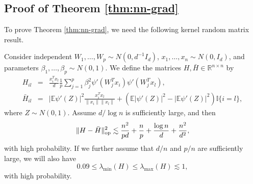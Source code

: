 \subsection{Proof of Theorem \ref{thm:nn-grad}}

To prove Theorem \ref{thm:nn-grad}, we need the following kernel random matrix result.
\begin{lemma}\label{lem:lim-H}
Consider independent $W_1,\ldots,W_p\sim N(0,d^{-1}I_d)$, $x_1,\ldots,x_n\sim N(0,I_d)$, and parameters $\beta_1,\ldots,\beta_p\sim N(0,1)$. We define the matrices $H, \bar{H}\in\mathbb{R}^{n\times n}$ by
\begin{eqnarray*}
H_{il} &=& \frac{x_i^Tx_l}{d}\frac{1}{p}\sum_{j=1}^p\beta_j^2\psi'(W^T_jx_i)\psi'(W_j^Tx_l), \\
\bar{H}_{il} &=& |\mathbb{E}\psi'(Z)|^2\frac{x_i^Tx_l}{\|x_i\|\|x_l\|} + \left(\mathbb{E}|\psi'(Z)|^2-|\mathbb{E}\psi'(Z)|^2\right)\mathbb{I}\{i=l\},
\end{eqnarray*}
where $Z\sim N(0,1)$.
Assume $d/\log n$ is sufficiently large, and then
$$\|H-\bar{H}\|_{\rm op}^2 \lesssim \frac{n^2}{pd} + \frac{n}{p} + \frac{\log n}{d} + \frac{n^2}{d^2},$$
with high probability. If we further assume that $d/n$ and $p/n$ are sufficiently large, we will also have
\begin{equation}
0.09\leq\lambda_{\min}(H)\leq \lambda_{\max}(H)\lesssim 1, \label{eq:spectrum-H-bound}
\end{equation}
with high probability.
\end{lemma}
